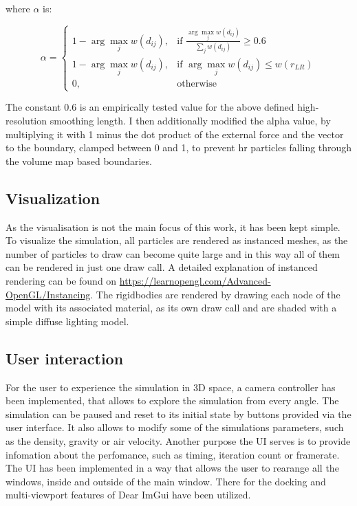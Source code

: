 \documentclass[intern]{cgMA}
\begin{document}
    where $\alpha$ is:

    \begin{equation}
        \alpha = 
        \begin{cases}
            1 - \arg \max_j w(d_{ij}),& \text{if } \frac{\arg \max_j w(d_{ij})}{\sum_j w(d_{ij})} \geq 0.6 \\
            1 - \arg \max_j w(d_{ij}),& \text{if } \arg \max_j w(d_{ij}) \leq w(r_{LR}) \\
            0,              & \text{otherwise}
        \end{cases}
    \end{equation}

    The constant $0.6$ is an empirically tested value for the above defined high-resolution smoothing length. \cite{10.2312:PE:vriphys:vriphys12:053-060} I then additionally modified the alpha value, by multiplying it with 1 minus the dot product of the external force and the vector to the boundary, clamped between 0 and 1, to prevent hr particles falling through the volume map based boundaries.
    
    \subsection{Visualization}
    As the visualisation is not the main focus of this work, it has been kept simple. To visualize the simulation, all particles are rendered as instanced meshes, as the number of particles to draw can become quite large and in this way all of them can be rendered in just one draw call. A detailed explanation of instanced rendering can be found on \url{https://learnopengl.com/Advanced-OpenGL/Instancing}. The rigidbodies are rendered by drawing each node of the model with its associated material, as its own draw call and are shaded with a simple diffuse lighting model.

    \subsection{User interaction}
    For the user to experience the simulation in 3D space, a camera controller has been implemented, that allows to explore the simulation from every angle. The simulation can be paused and reset to its initial state by buttons provided via the user interface. It also allows to modify some of the simulations parameters, such as the density, gravity or air velocity. Another purpose the UI serves is to provide infomation about the perfomance, such as timing, iteration count or framerate. The UI has been implemented in a way that allows the user to rearange all the windows, inside and outside of the main window. There for the docking and multi-viewport features of Dear ImGui have been utilized.
   
\end{document}
